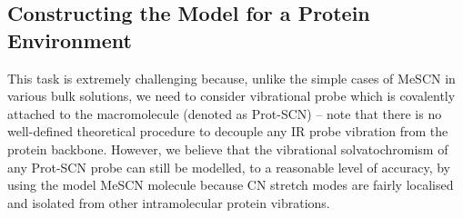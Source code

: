 \documentclass[a4paper,titlepage,twoside,fleqn,12pt]{book}
\begin{document}
\begin{refsection}
\subsection{Constructing the Model for a Protein Environment\label{s:scn-protein-interfac-model-environ}}

This task is
extremely challenging because, unlike the simple cases of
MeSCN in various bulk solutions, we need to consider
vibrational probe which is covalently attached to the
macromolecule (denoted as Prot-SCN) -- note that there is no
well\hyp{}defined theoretical procedure to decouple any IR probe
vibration from the protein backbone. However, we believe
that the vibrational solvatochromism of any Prot-SCN probe
can still be modelled, to a reasonable level of accuracy, by
using the model MeSCN molecule because CN stretch modes
are fairly localised and isolated from other intramolecular
protein vibrations.


\end{refsection}
\end{document}
